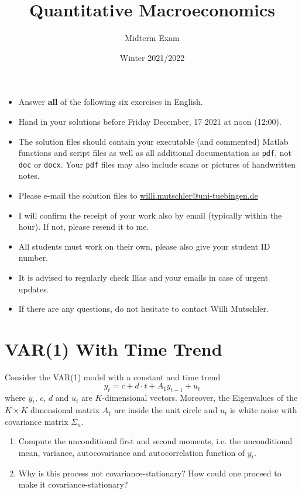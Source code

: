 \documentclass{article}
\begin{document}
	
	\title{Quantitative Macroeconomics}
	\author{Midterm Exam}
	\date{Winter 2021/2022}
	\maketitle
	
	\begin{itemize}
		\item Answer \textbf{all} of the following six exercises in English.
		
		\item Hand in your solutions before Friday December, 17 2021 at noon (12:00).
		
		\item The solution files should contain your executable (and commented) Matlab functions and script files as well as all additional documentation as \texttt{pdf}, not \texttt{doc} or \texttt{docx}. Your \texttt{pdf} files may also include scans or pictures of handwritten notes.
		
		\item Please e-mail the solution files to \url{willi.mutschler@uni-tuebingen.de}
		
		\item I will confirm the receipt of your work also by email (typically within the hour). If not, please resend it to me.
		
		\item All students must work on their own, please also give your student ID number.
		
		\item It is advised to regularly check Ilias and your emails in case of urgent updates.
		
		\item If there are any questions, do not hesitate to contact Willi Mutschler.
	\end{itemize}
	\newpage

	
\section[VAR(1) With Time Trend]{VAR(1) With Time Trend\label{ex:VAR1timetrend}}
Consider the VAR(1) model with a constant and time trend
$$ y_t = c + d\cdot t + A_1 y_{t-1} + u_t$$
where $y_t$, $c$, $d$ and $u_t$ are $K$-dimensional vectors. Moreover, the Eigenvalues of the $K \times K$ dimensional matrix $A_1$ are inside the unit circle and $u_t$ is white noise with covariance matrix $\Sigma_u$.
\begin{enumerate}
	\item Compute the unconditional first and second moments, i.e. the unconditional mean, variance, autocovariance and autocorrelation function of $y_t$.
	\item Why is this process not covariance-stationary? How could one proceed to make it covariance-stationary?
\end{enumerate}
\end{document}
